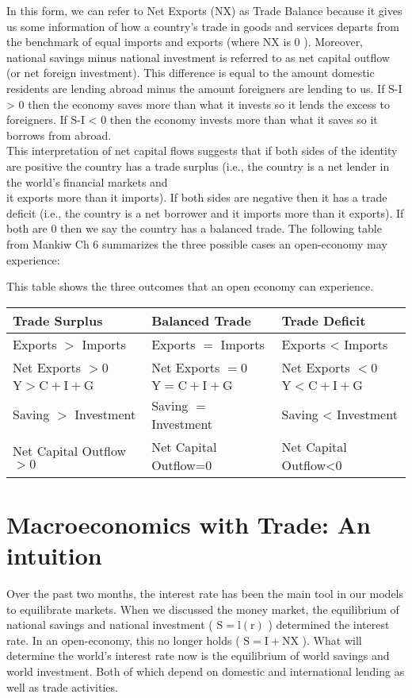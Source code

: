 \documentclass[10pt]{article}
\begin{document}
In this form, we can refer to Net Exports (NX) as Trade Balance because it gives us some information of how a country's trade in goods and services departs from the benchmark of equal imports and exports (where NX is 0 ). Moreover, national savings minus national investment is referred to as net capital outflow (or net foreign investment). This difference is equal to the amount domestic residents are lending abroad minus the amount foreigners are lending to us. If S-I > 0 then the economy saves more than what it invests so it lends the excess to foreigners. If S-I < 0 then the economy invests more than what it saves so it borrows from abroad.\\
This interpretation of net capital flows suggests that if both sides of the identity are positive the country has a trade surplus (i.e., the country is a net lender in the world's financial markets and\\
it exports more than it imports). If both sides are negative then it has a trade deficit (i.e., the country is a net borrower and it imports more than it exports). If both are 0 then we say the country has a balanced trade. The following table from Mankiw Ch 6 summarizes the three possible cases an open-economy may experience:

This table shows the three outcomes that an open economy can experience.

\begin{center}
\begin{tabular}{lll}
\hline
Trade Surplus & Balanced Trade & Trade Deficit \\
\hline
Exports $>$ Imports & Exports $=$ Imports & Exports < Imports \\
\hline
Net Exports $>0$ & Net Exports $=0$ & Net Exports $<0$ \\
\hline
$\mathrm{Y}>\mathrm{C}+\mathrm{I}+\mathrm{G}$ & $\mathrm{Y}=\mathrm{C}+\mathrm{I}+\mathrm{G}$ & $\mathrm{Y}<\mathrm{C}+\mathrm{I}+\mathrm{G}$ \\
\hline
Saving $>$ Investment & Saving $=$ Investment & Saving < Investment \\
\hline
Net Capital Outflow $>0$ & Net Capital Outflow=0 & Net Capital Outflow<0 \\
\hline
\end{tabular}
\end{center}

\section*{Macroeconomics with Trade: An intuition}
Over the past two months, the interest rate has been the main tool in our models to equilibrate markets. When we discussed the money market, the equilibrium of national savings and national investment ( $\mathrm{S}=\mathrm{l}(\mathrm{r})$ ) determined the interest rate. In an open-economy, this no longer holds ( $\mathrm{S}=\mathrm{I}+\mathrm{NX}$ ). What will determine the world's interest rate now is the equilibrium of world savings and world investment. Both of which depend on domestic and international lending as well as trade activities.
\end{document}
